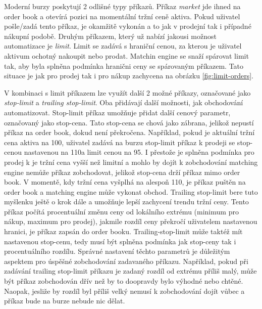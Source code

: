 Moderní burzy poskytují 2 odlišné typy příkazů. Příkaz \emph{market} jde ihned na order book a otevírá pozici na momentální tržní ceně aktiva. Pokud uživatel
pošle/zadá tento příkaz, je okamžitě vykonán a to jak v prodejní tak i případné nákupní podobě. Druhým příkazem, který už nabízí jakousi možnost automatizace
je \emph{limit}.
Limit se zadává s hraniční cenou, za kterou je uživatel aktivum ochotný nakoupit nebo prodat. Matchin engine se snaží spárovat limit tak, aby byla splněna podmínka
hranični ceny se spárovaným příkazem. Tato situace je jak pro prodej tak i pro nákup zachycena na obrázku \ref{fig:limit-orders}.

V kombinaci s limit příkazem lze využít další 2 možné příkazy, označované jako \emph{stop-limit} a \emph{trailing stop-limit}. Oba přidávají další možnosti,
jak obchodování automatizovat. Stop-limit příkaz umožňuje přidat další cenový parametr, označovaný jako stop-cena. Tato stop-cena se chová jako zábrana, jelikož
nepustí příkaz na order book, dokud není překročena. Například, pokud je aktuální tržní cena aktiva na 100\texteuro, uživatel zadává na burzu stop-limit příkaz k
prodeji se stop-cenou nastavenou na 110\texteuro a limit cenou na 95\texteuro. I přestože je splněna podmínka pro prodej k je tržní cena vyšší než limitní
a mohlo by dojít k zobchodování matching engine nemůže příkaz zobchodovat, jelikož stop-cena drží příkaz mimo order book. V momentě, kdy tržní cena vyšplhá na
alespoň 110\texteuro, je příkaz puštěn na order book a matching engine může vykonat obchod. %
Trailing stop-limit bere tuto myšlenku ještě o krok dále a umožňuje lepší zachycení trendu tržní ceny. Tento příkaz počítá procentuální změnu ceny od lokálního
extrému (minimum pro nákup, maximum pro prodej), jakmile rozdíl ceny překročí uživatelem nastavenou hranici, je příkaz zapsán do order booku. Trailing-stop-limit
může taktéž mít nastavenou stop-cenu, tedy musí být splněna podmínka jak stop-ceny tak i procentuálního rozdílu.  %
Správné nastavení těchto parametrů je důležitým aspektem pro úspěšné zobchodování zadavaného příkazu. Například, pokud při zadávání trailing stop-limit příkazu
je zadaný rozdíl od extrému příliš malý, může být příkaz zobchodován dřív než by to doopravdy bylo výhodné nebo chtěné. Naopak, jesliže by rozdíl byl příliš velký
nemusí k zobchodování dojít vůbec a příkaz bude na burze nebude nic dělat.

